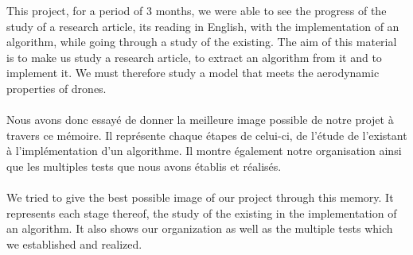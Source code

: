 This project, for a period of 3 months, we were able to see the progress of the study of a research article, its reading in English, with the implementation of an algorithm, while going through a study of the existing.
The aim of this material is to make us study a research article, to extract an algorithm from it and to implement it.
We must therefore study a model that meets the aerodynamic properties of drones.
\\\\
Nous avons donc essayé de donner la meilleure image possible de notre projet à travers ce mémoire. Il représente chaque étapes de celui-ci, de l'étude de l'existant à l'implémentation d'un algorithme. Il montre également notre organisation ainsi que les multiples tests que nous avons établis et réalisés.
\\\\
We tried to give the best possible image of our project through this memory. It represents each stage thereof, the study of the existing in the implementation of an algorithm. It also shows our organization as well as the multiple tests which we established and realized. 
